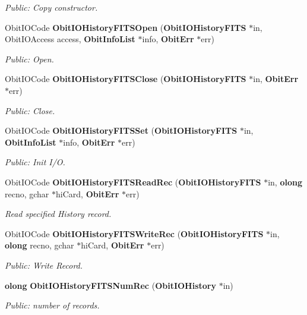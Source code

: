 \begin{CompactItemize}
\begin{CompactList}\small\item\em Public: Copy constructor. \item\end{CompactList}\item 
Obit\-IOCode {\bf Obit\-IOHistory\-FITSOpen} ({\bf Obit\-IOHistory\-FITS} $\ast$in, Obit\-IOAccess access, {\bf Obit\-Info\-List} $\ast$info, {\bf Obit\-Err} $\ast$err)
\begin{CompactList}\small\item\em Public: Open. \item\end{CompactList}\item 
Obit\-IOCode {\bf Obit\-IOHistory\-FITSClose} ({\bf Obit\-IOHistory\-FITS} $\ast$in, {\bf Obit\-Err} $\ast$err)
\begin{CompactList}\small\item\em Public: Close. \item\end{CompactList}\item 
Obit\-IOCode {\bf Obit\-IOHistory\-FITSSet} ({\bf Obit\-IOHistory\-FITS} $\ast$in, {\bf Obit\-Info\-List} $\ast$info, {\bf Obit\-Err} $\ast$err)
\begin{CompactList}\small\item\em Public: Init I/O. \item\end{CompactList}\item 
Obit\-IOCode {\bf Obit\-IOHistory\-FITSRead\-Rec} ({\bf Obit\-IOHistory\-FITS} $\ast$in, {\bf olong} recno, gchar $\ast$hi\-Card, {\bf Obit\-Err} $\ast$err)
\begin{CompactList}\small\item\em Read specified History record. \item\end{CompactList}\item 
Obit\-IOCode {\bf Obit\-IOHistory\-FITSWrite\-Rec} ({\bf Obit\-IOHistory\-FITS} $\ast$in, {\bf olong} recno, gchar $\ast$hi\-Card, {\bf Obit\-Err} $\ast$err)
\begin{CompactList}\small\item\em Public: Write Record. \item\end{CompactList}\item 
{\bf olong} {\bf Obit\-IOHistory\-FITSNum\-Rec} ({\bf Obit\-IOHistory} $\ast$in)
\begin{CompactList}\small\item\em Public: number of records. \item\end{CompactList}\item 

\end{CompactItemize}
